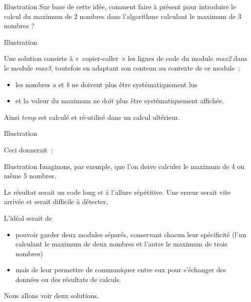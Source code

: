\begin{frame}{Illustration}
	Sur base de cette idée, comment faire à présent
	pour introduire le calcul du maximum de 2 nombres dans l’algorithme
	calculant le maximum de 3 nombres ? 
\end{frame}

\begin{frame}{Illustration}

	Une solution consiste à
	«~copier-coller~» les lignes de code du module
	\textit{{max2}}	dans le module
	\textit{{max3}}, toutefois en adaptant son contenu 
	au contexte de ce module~: 
	
	\bigskip
	\begin{itemize}
	\item
	les nombres
	\textit{{a}}	et
	\textit{{b}}
	ne doivent plus être systématiquement lus 
	\item
	et la valeur du maximum ne
	doit plus être systématiquement affichée. 
	\end{itemize}
	
	\bigskip
	
	Ainsi \textit{{temp}}
	est calculé et ré-utilisé dans un calcul ultérieur.
\end{frame}

\begin{frame}{Illustration}

	Ceci donnerait~:

\end{frame}

\begin{frame}{Illustration}
	Imaginons, par exemple, que l'on doive calculer le
	maximum de 4 ou même 5 nombres. 
	
	\bigskip
	
	Le résultat serait un code long et
	à l'allure répétitive. Une erreur serait vite arrivée et
	serait difficile à détecter.
	
	\bigskip
	
	L’idéal serait de 
	\begin{itemize}
	\item
	pouvoir garder deux modules séparés, conservant chacun
	leur spécificité (l’un calculant le maximum de deux nombres et l’autre
	le maximum de trois nombres) 
	\item
	mais de leur permettre de communiquer
	entre eux pour s’échanger des données ou des résultats de calculs. 
	\end{itemize}
	
	\bigskip
	
	Nous allons voir deux solutions.
\end{frame}

